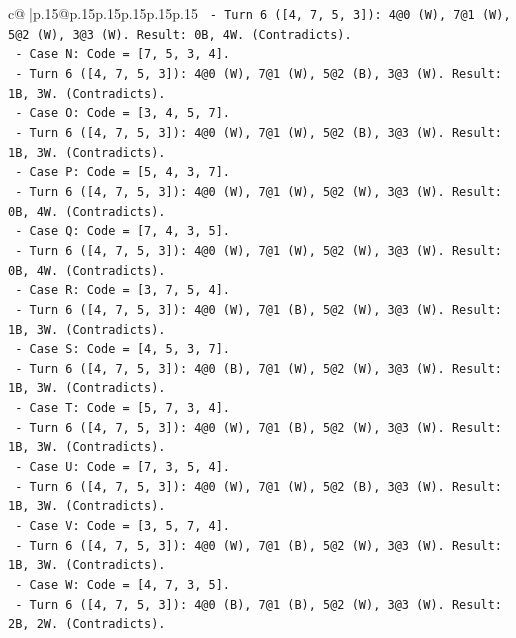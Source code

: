 \documentclass{article}
\begin{document}
{\begin{supertabular}{c@{$\;$}|p{.15\linewidth}@{}p{.15\linewidth}p{.15\linewidth}p{.15\linewidth}p{.15\linewidth}p{.15\linewidth}}
{{{\texttt{        {-} Turn 6 ({[}4, 7, 5, 3{]}): 4@0 (W), 7@1 (W), 5@2 (W), 3@3 (W). Result: 0B, 4W. (Contradicts).} \\
\texttt{      {-} Case N: Code = {[}7, 5, 3, 4{]}.} \\
\texttt{        {-} Turn 6 ({[}4, 7, 5, 3{]}): 4@0 (W), 7@1 (W), 5@2 (B), 3@3 (W). Result: 1B, 3W. (Contradicts).} \\
\texttt{      {-} Case O: Code = {[}3, 4, 5, 7{]}.} \\
\texttt{        {-} Turn 6 ({[}4, 7, 5, 3{]}): 4@0 (W), 7@1 (W), 5@2 (B), 3@3 (W). Result: 1B, 3W. (Contradicts).} \\
\texttt{      {-} Case P: Code = {[}5, 4, 3, 7{]}.} \\
\texttt{        {-} Turn 6 ({[}4, 7, 5, 3{]}): 4@0 (W), 7@1 (W), 5@2 (W), 3@3 (W). Result: 0B, 4W. (Contradicts).} \\
\texttt{      {-} Case Q: Code = {[}7, 4, 3, 5{]}.} \\
\texttt{        {-} Turn 6 ({[}4, 7, 5, 3{]}): 4@0 (W), 7@1 (W), 5@2 (W), 3@3 (W). Result: 0B, 4W. (Contradicts).} \\
\texttt{      {-} Case R: Code = {[}3, 7, 5, 4{]}.} \\
\texttt{        {-} Turn 6 ({[}4, 7, 5, 3{]}): 4@0 (W), 7@1 (B), 5@2 (W), 3@3 (W). Result: 1B, 3W. (Contradicts).} \\
\texttt{      {-} Case S: Code = {[}4, 5, 3, 7{]}.} \\
\texttt{        {-} Turn 6 ({[}4, 7, 5, 3{]}): 4@0 (B), 7@1 (W), 5@2 (W), 3@3 (W). Result: 1B, 3W. (Contradicts).} \\
\texttt{      {-} Case T: Code = {[}5, 7, 3, 4{]}.} \\
\texttt{        {-} Turn 6 ({[}4, 7, 5, 3{]}): 4@0 (W), 7@1 (B), 5@2 (W), 3@3 (W). Result: 1B, 3W. (Contradicts).} \\
\texttt{      {-} Case U: Code = {[}7, 3, 5, 4{]}.} \\
\texttt{        {-} Turn 6 ({[}4, 7, 5, 3{]}): 4@0 (W), 7@1 (W), 5@2 (B), 3@3 (W). Result: 1B, 3W. (Contradicts).} \\
\texttt{      {-} Case V: Code = {[}3, 5, 7, 4{]}.} \\
\texttt{        {-} Turn 6 ({[}4, 7, 5, 3{]}): 4@0 (W), 7@1 (B), 5@2 (W), 3@3 (W). Result: 1B, 3W. (Contradicts).} \\
\texttt{      {-} Case W: Code = {[}4, 7, 3, 5{]}.} \\
\texttt{        {-} Turn 6 ({[}4, 7, 5, 3{]}): 4@0 (B), 7@1 (B), 5@2 (W), 3@3 (W). Result: 2B, 2W. (Contradicts).} \\
}}}
\end{supertabular}}
\end{document}
